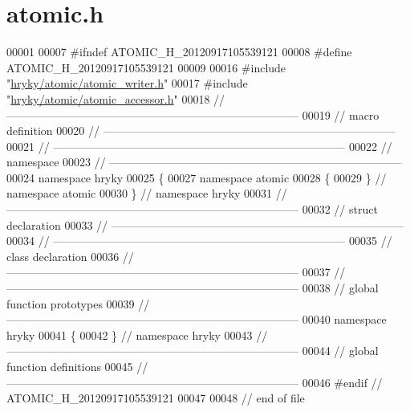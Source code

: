 \hypertarget{atomic_8h_source}{\section{atomic.\-h}
}

\begin{DoxyCode}
00001 
00007 \textcolor{preprocessor}{#ifndef ATOMIC\_H\_20120917105539121}
00008 \textcolor{preprocessor}{}\textcolor{preprocessor}{#define ATOMIC\_H\_20120917105539121}
00009 \textcolor{preprocessor}{}
00016 \textcolor{preprocessor}{#include "\hyperlink{atomic__writer_8h}{hryky/atomic/atomic_writer.h}"}
00017 \textcolor{preprocessor}{#include "\hyperlink{atomic__accessor_8h}{hryky/atomic/atomic_accessor.h}"}
00018 \textcolor{comment}{//
      ------------------------------------------------------------------------------}
00019 \textcolor{comment}{// macro definition}
00020 \textcolor{comment}{//
      ------------------------------------------------------------------------------}
00021 \textcolor{comment}{//
      ------------------------------------------------------------------------------}
00022 \textcolor{comment}{// namespace}
00023 \textcolor{comment}{//
      ------------------------------------------------------------------------------}
00024 \textcolor{keyword}{namespace }hryky
00025 \{
00027 \textcolor{keyword}{namespace }atomic
00028 \{
00029 \} \textcolor{comment}{// namespace atomic}
00030 \} \textcolor{comment}{// namespace hryky}
00031 \textcolor{comment}{//
      ------------------------------------------------------------------------------}
00032 \textcolor{comment}{// struct declaration}
00033 \textcolor{comment}{//
      ------------------------------------------------------------------------------}
00034 \textcolor{comment}{//
      ------------------------------------------------------------------------------}
00035 \textcolor{comment}{// class declaration}
00036 \textcolor{comment}{//
      ------------------------------------------------------------------------------}
00037 \textcolor{comment}{//
      ------------------------------------------------------------------------------}
00038 \textcolor{comment}{// global function prototypes}
00039 \textcolor{comment}{//
      ------------------------------------------------------------------------------}
00040 \textcolor{keyword}{namespace }hryky
00041 \{
00042 \} \textcolor{comment}{// namespace hryky}
00043 \textcolor{comment}{//
      ------------------------------------------------------------------------------}
00044 \textcolor{comment}{// global function definitions}
00045 \textcolor{comment}{//
      ------------------------------------------------------------------------------}
00046 \textcolor{preprocessor}{#endif // ATOMIC\_H\_20120917105539121}
00047 \textcolor{preprocessor}{}
00048 \textcolor{comment}{// end of file}
\end{DoxyCode}

